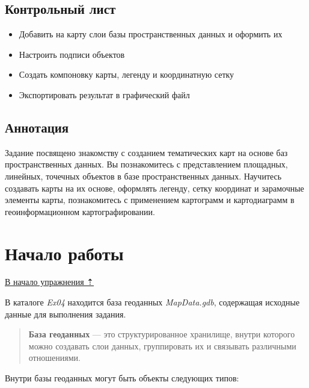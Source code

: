 \documentclass[]{book}
\providecommand{\tightlist}{%
  \setlength{\itemsep}{0pt}\setlength{\parskip}{0pt}}
\theoremstyle{definition}
\theoremstyle{definition}
\theoremstyle{definition}
\theoremstyle{remark}
\begin{document}
\hypertarget{map-design-economic-control}{%
\subsection{Контрольный лист}\label{map-design-economic-control}}

\begin{itemize}
\tightlist
\item
  Добавить на карту слои базы пространственных данных и оформить их
\item
  Настроить подписи объектов
\item
  Создать компоновку карты, легенду и координатную сетку
\item
  Экспортировать результат в графический файл
\end{itemize}

\hypertarget{map-design-economic-annotation}{%
\subsection{Аннотация}\label{map-design-economic-annotation}}

Задание посвящено знакомству с созданием тематических карт на основе баз
пространственных данных. Вы познакомитесь с представлением площадных,
линейных, точечных объектов в базе пространственных данных. Научитесь
создавать карты на их основе, оформлять легенду, сетку координат и
зарамочные элементы карты, познакомитесь с применением картограмм и
картодиаграмм в геоинформационном картографировании.

\hypertarget{map-design-economic-begin}{%
\section{Начало работы}\label{map-design-economic-begin}}

\protect\hyperlink{map-design-economic}{В начало упражнения ⇡}

В каталоге \emph{Ex04} находится база геоданных \emph{MapData.gdb},
содержащая исходные данные для выполнения задания.

\begin{quote}
\textbf{База геоданных} --- это структурированное хранилище, внутри
которого можно создавать слои данных, группировать их и связывать
различными отношениями.
\end{quote}

Внутри базы геоданных могут быть объекты следующих типов:
\end{document}
